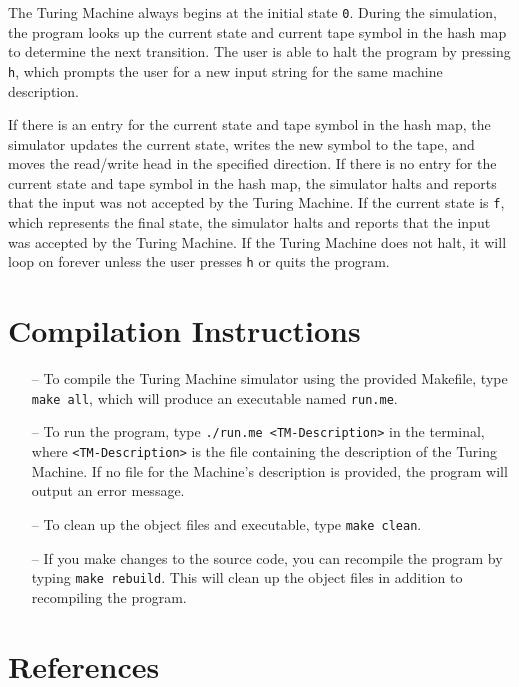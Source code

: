 \documentclass{article}
\begin{document}
The Turing Machine always begins at the initial state \texttt{0}.
During the simulation, the program looks up the current state and current tape symbol in the hash map to determine the next transition. 
The user is able to halt the program by pressing \texttt{h}, which prompts the user for a new input string for the same machine description.

If there is an entry for the current state and tape symbol in the hash map, the simulator updates the current state, writes the new symbol to the tape, and moves the read/write head in the specified direction. 
If there is no entry for the current state and tape symbol in the hash map, the simulator halts and reports that the input was not accepted by the Turing Machine. 
If the current state is \texttt{f}, which represents the final state, the simulator halts and reports that the input was accepted by the Turing Machine.
If the Turing Machine does not halt, it will loop on forever unless the user presses \texttt{h} or quits the program.


\section{Compilation Instructions}

\begin{itemize}

    \item[--] To compile the Turing Machine simulator using the provided Makefile, type \texttt{make all}, which will produce an executable named \texttt{run.me}.
    
    \item[--] To run the program, type \texttt{./run.me <TM-Description>} in the terminal, where \texttt{<TM-Description>} is the file containing the description of the Turing Machine. If no file for the Machine's description is provided, the program will output an error message.
    
    \item[--] To clean up the object files and executable, type \texttt{make clean}.
    
    \item[--] If you make changes to the source code, you can recompile the program by typing \texttt{make rebuild}. 
    This will clean up the object files in addition to recompiling the program.
    
\end{itemize}

\section{References}
\end{document}
